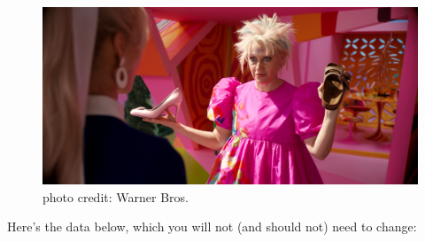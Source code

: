 \documentclass[
  letterpaper,
  DIV=11,
  numbers=noendperiod]{scrreprt}
\begin{document}
\begin{figure}[H]

{\centering \includegraphics{scripts/01_codingBasics/class2-files/weirdbarbie.jpeg}

}

\caption{photo credit: Warner Bros.}

\end{figure}%

Here's the data below, which you will not (and should not) need to
change:
\end{document}
